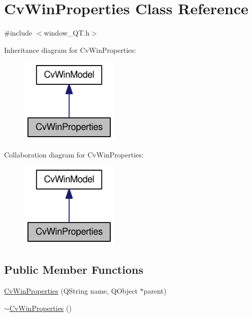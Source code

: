 \hypertarget{classCvWinProperties}{
\section{CvWinProperties Class Reference}
\label{classCvWinProperties}
}


{\ttfamily \#include $<$window\_\-QT.h$>$}



Inheritance diagram for CvWinProperties:\nopagebreak
\begin{figure}[H]
\begin{center}
\leavevmode
\includegraphics[width=132pt]{classCvWinProperties__inherit__graph}
\end{center}
\end{figure}


Collaboration diagram for CvWinProperties:\nopagebreak
\begin{figure}[H]
\begin{center}
\leavevmode
\includegraphics[width=132pt]{classCvWinProperties__coll__graph}
\end{center}
\end{figure}
\subsection*{Public Member Functions}
\begin{DoxyCompactItemize}
\item 
\hyperlink{classCvWinProperties_a916ba2a24b09baaa9bb9efd7d16606e3}{CvWinProperties} (QString name, QObject $\ast$parent)
\item 
\hyperlink{classCvWinProperties_a0953344aa7f41767c0da7ee59b17e0bb}{$\sim$CvWinProperties} ()
\end{DoxyCompactItemize}
